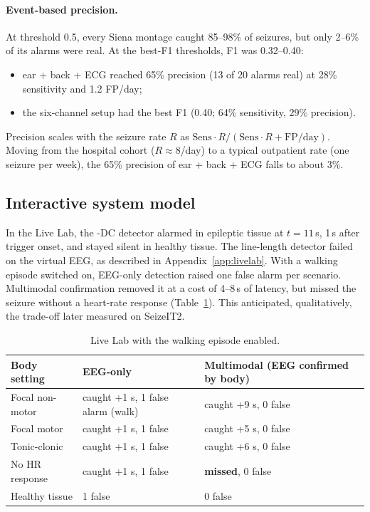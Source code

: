 \paragraph{Event-based precision.} At threshold 0.5, every Siena montage caught 85--98\% of seizures, but only 2--6\% of its alarms were real. At the best-F1 thresholds, F1 was 0.32--0.40:
\begin{itemize}
\item ear + back + ECG reached 65\% precision (13 of 20 alarms real) at 28\% sensitivity and 1.2 FP/day;
\item the six-channel setup had the best F1 (0.40; 64\% sensitivity, 29\% precision).
\end{itemize}
Precision scales with the seizure rate $R$ as $\mathrm{Sens}\cdot R/(\mathrm{Sens}\cdot R+\mathrm{FP/day})$. Moving from the hospital cohort ($R\approx8$/day) to a typical outpatient rate (one seizure per week), the 65\% precision of ear + back + ECG falls to about 3\%.

\subsection{Interactive system model}

In the Live Lab, the \Kp-DC detector alarmed in epileptic tissue at $t=11$\,s, 1\,s after trigger onset, and stayed silent in healthy tissue. The line-length detector failed on the virtual EEG, as described in Appendix~\ref{app:livelab}. With a walking episode switched on, EEG-only detection raised one false alarm per scenario. Multimodal confirmation removed it at a cost of 4--8\,s of latency, but missed the seizure without a heart-rate response (Table~\ref{tab:live}). This anticipated, qualitatively, the trade-off later measured on SeizeIT2.

\begin{table}[htbp]
\centering\small
\caption{Live Lab with the walking episode enabled.}
\label{tab:live}
\begin{tabular}{@{}lll@{}}
\toprule
Body setting & EEG-only & Multimodal (EEG confirmed by body) \\
\midrule
Focal non-motor & caught +1 s, 1 false alarm (walk) & caught +9 s, 0 false \\
Focal motor & caught +1 s, 1 false & caught +5 s, 0 false \\
Tonic-clonic & caught +1 s, 1 false & caught +6 s, 0 false \\
No HR response & caught +1 s, 1 false & \textbf{missed}, 0 false \\
Healthy tissue & 1 false & 0 false \\
\bottomrule
\end{tabular}
\end{table}
